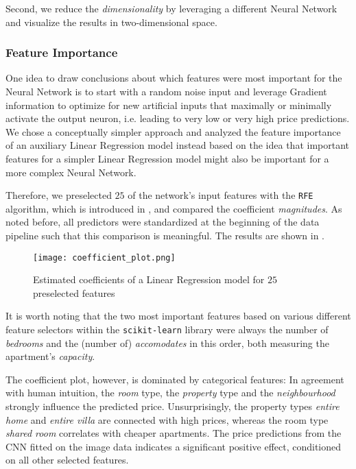 Second, we reduce the \emph{dimensionality} by leveraging a different Neural Network and visualize the results in two-dimensional space.

\subsubsection{Feature Importance}

One idea to draw conclusions about which features were most important for the Neural Network is to start with a random noise input and leverage Gradient information to optimize for new artificial inputs that maximally or minimally activate the output neuron, i.e. leading to very low or very high price predictions.
We chose a conceptually simpler approach and analyzed the feature importance of an auxiliary Linear Regression model instead based on the idea that important features for a simpler Linear Regression model might also be important for a more complex Neural Network.

Therefore, we preselected $25$ of the network's input features with the \texttt{RFE} algorithm, which is introduced in , and compared the coefficient \emph{magnitudes}.
As noted before, all predictors were standardized at the beginning of the data pipeline such that this comparison is meaningful.
The results are shown in .

\begin{figure}[t]
  \centering
  \texttt{[image: coefficient\_plot.png]}
  \caption{Estimated coefficients of a Linear Regression model for $25$ preselected features}
  \label{fig:coefficient-plot}
\end{figure}

It is worth noting that the two most important features based on various different feature selectors within the \texttt{scikit-learn} library were always the number of \emph{bedrooms} and the (number of) \emph{accomodates} in this order, both measuring the apartment's \emph{capacity}.

The coefficient plot, however, is dominated by categorical features:
In agreement with human intuition, the \emph{room} type, the \emph{property} type and the \emph{neighbourhood} strongly influence the predicted price.
Unsurprisingly, the property types \emph{entire home} and \emph{entire villa} are connected with high prices, whereas the room type \emph{shared room} correlates with cheaper apartments.
The price predictions from the CNN fitted on the image data indicates a significant positive effect, conditioned on all other selected features.

